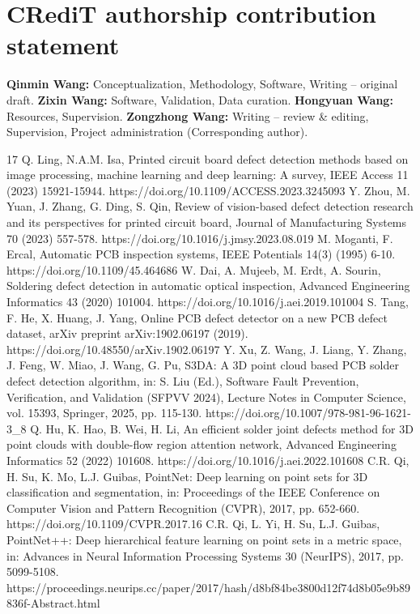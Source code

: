 \documentclass[3p]{elsarticle}
\begin{document}
\section*{CRediT authorship contribution statement}
\textbf{Qinmin Wang:} Conceptualization, Methodology, Software, Writing -- original draft.
\textbf{Zixin Wang:} Software, Validation, Data curation.
\textbf{Hongyuan Wang:} Resources, Supervision.
\textbf{Zongzhong Wang:} Writing -- review \& editing, Supervision, Project administration (Corresponding author).
\setlength{\bibsep}{0pt}
\begin{thebibliography}{17}\footnotesize
{}Q. Ling, N.A.M. Isa, Printed circuit board defect detection methods based on image processing, machine learning and deep learning: A survey, IEEE Access 11 (2023) 15921-15944. https://doi.org/10.1109/ACCESS.2023.3245093
Y. Zhou, M. Yuan, J. Zhang, G. Ding, S. Qin, Review of vision-based defect detection research and its perspectives for printed circuit board, Journal of Manufacturing Systems 70 (2023) 557-578. https://doi.org/10.1016/j.jmsy.2023.08.019
M. Moganti, F. Ercal, Automatic PCB inspection systems, IEEE Potentials 14(3) (1995) 6-10. https://doi.org/10.1109/45.464686
W. Dai, A. Mujeeb, M. Erdt, A. Sourin, Soldering defect detection in automatic optical inspection, Advanced Engineering Informatics 43 (2020) 101004. https://doi.org/10.1016/j.aei.2019.101004
S. Tang, F. He, X. Huang, J. Yang, Online PCB defect detector on a new PCB defect dataset, arXiv preprint arXiv:1902.06197 (2019). https://doi.org/10.48550/arXiv.1902.06197
Y. Xu, Z. Wang, J. Liang, Y. Zhang, J. Feng, W. Miao, J. Wang, G. Pu, S3DA: A 3D point cloud based PCB solder defect detection algorithm, in: S. Liu (Ed.), Software Fault Prevention, Verification, and Validation (SFPVV 2024), Lecture Notes in Computer Science, vol. 15393, Springer, 2025, pp. 115-130. https://doi.org/10.1007/978-981-96-1621-3\_8
Q. Hu, K. Hao, B. Wei, H. Li, An efficient solder joint defects method for 3D point clouds with double-flow region attention network, Advanced Engineering Informatics 52 (2022) 101608. https://doi.org/10.1016/j.aei.2022.101608
C.R. Qi, H. Su, K. Mo, L.J. Guibas, PointNet: Deep learning on point sets for 3D classification and segmentation, in: Proceedings of the IEEE Conference on Computer Vision and Pattern Recognition (CVPR), 2017, pp. 652-660. https://doi.org/10.1109/CVPR.2017.16
C.R. Qi, L. Yi, H. Su, L.J. Guibas, PointNet++: Deep hierarchical feature learning on point sets in a metric space, in: Advances in Neural Information Processing Systems 30 (NeurIPS), 2017, pp. 5099-5108. https://proceedings.neurips.cc/paper/2017/hash/d8bf84be3800d12f74d8b05e9b89836f-Abstract.html

\end{thebibliography}
\end{document}
